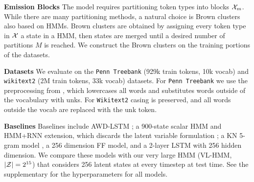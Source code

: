 \documentclass[11pt,a4paper]{article}
\begin{document}
\textbf{Emission Blocks}
The model requires partitioning token types into blocks $\mathcal{X}_m$. 
While there are many partitioning methods, a natural choice
is Brown clusters \citep{brown1992,liang2005brown} also based on HMMs.
Brown clusters are obtained by assigning every token type in $\mathcal{X}$ a state in a HMM,
then states are merged until a desired number of partitions $M$ is reached.
We construct the Brown clusters on the training portions of the datasets.


\noindent \textbf{Datasets}
We evaluate on the \texttt{Penn Treebank} \citep{ptb} (929k train tokens, 10k vocab)
and \texttt{wikitext2} \citep{wikitext} (2M train tokens, 33k vocab) datasets.
For \texttt{Penn Treebank} we use the preprocessing from \citet{mikolov-2011},
which lowercases all words and substitutes words outside of the vocabulary with unks.  For \texttt{Wikitext2}  casing is preserved, and all words outside the vocab are replaced with the unk token.

\noindent \textbf{Baselines}
Baselines include AWD-LSTM \citep{merity2017awdlstm};
a 900-state scalar HMM and HMM+RNN extension,
which discards the latent variable formulation \citep{buys2018hmm};
a KN 5-gram model \citep{mikolov2012rnn,kenlm},
a 256 dimension FF model,
and a 2-layer LSTM with 256 hidden dimension.
We compare these models with our very large HMM (VL-HMM, $|\mathcal{Z}|=2^{15}$) that considers 256 latent states at every timestep at test time. See the supplementary for the hyperparameters for all models.
\end{document}
